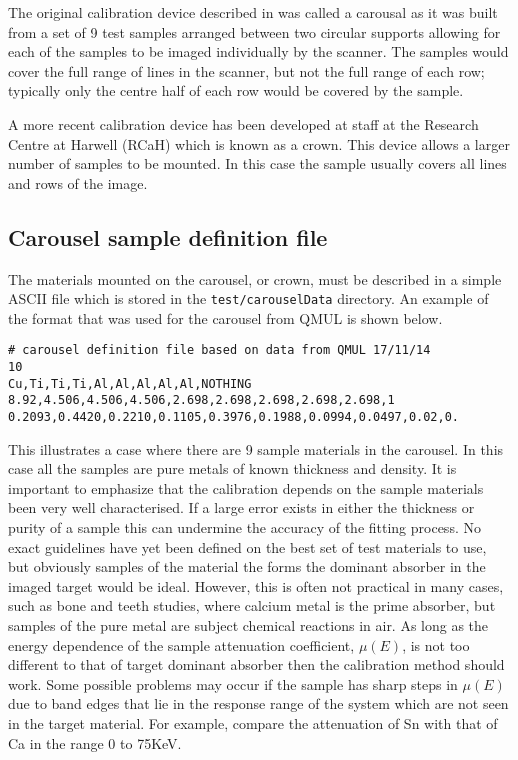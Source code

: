 \documentclass[a4paper,12pt]{article}
\begin{document}
The original calibration device described in \cite{davis} was called a carousal as it was built from a set of 9 test samples
arranged between two circular supports allowing for each of the samples to be imaged individually by the scanner.
The samples would cover the full range of lines in the scanner, but not the full range of each row; typically only
the centre half of each row would be covered by the sample.

A more recent calibration device has been developed at staff at the Research Centre at Harwell (RCaH) which is
known as a crown. This device allows a larger number of samples to be mounted.
In this case the sample usually covers all lines and rows of the image.

\subsection{Carousel sample definition file}

The materials mounted on the carousel, or crown, must be described in a simple ASCII file which is stored
in the \texttt{test/carouselData} directory.
An example of the format that was used for the carousel from QMUL is shown below.
\begin{verbatim}
# carousel definition file based on data from QMUL 17/11/14
10
Cu,Ti,Ti,Ti,Al,Al,Al,Al,Al,NOTHING
8.92,4.506,4.506,4.506,2.698,2.698,2.698,2.698,2.698,1
0.2093,0.4420,0.2210,0.1105,0.3976,0.1988,0.0994,0.0497,0.02,0.
\end{verbatim}

This illustrates a case where there are 9 sample materials in the carousel.
In this case all the samples are pure metals of known thickness and density.
It is important to emphasize that the calibration depends on the sample materials
been very well characterised.
If a large error exists in either the thickness or purity of a sample this can undermine
the accuracy of the fitting process.
No exact guidelines have yet been defined on the best set of test materials to use, but obviously
samples of the material the forms the dominant absorber in the imaged target would be ideal.
However, this is often not practical in many cases, such as bone and teeth studies, where calcium metal
is the prime absorber, but samples of the pure metal are subject chemical reactions in air.
As long as the energy dependence of the sample attenuation coefficient, $\mu(E)$, is not too different to that of
target dominant absorber then the calibration method should work.
Some possible problems may occur if the sample has sharp steps in $\mu(E)$ due to band edges that lie in the
response range of the system which are not seen in the target material.
For example, compare the attenuation of Sn with that of Ca in the range 0 to 75KeV.
\end{document}
